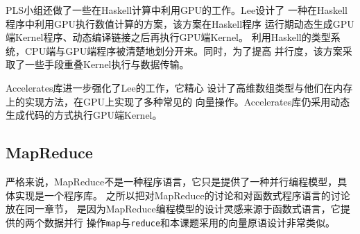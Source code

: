 PLS小组还做了一些在Haskell计算中利用GPU的工作。Lee设计了
一种在Haskell程序中利用GPU执行数值计算的方案，该方案在Haskell程序
运行期动态生成GPU端Kernel程序、动态编译链接之后再执行GPU端Kernel。
利用Haskell的类型系统，CPU端与GPU端程序被清楚地划分开来。同时，为了提高
并行度，该方案采取了一些手段重叠Kernel执行与数据传输。

Accelerates库进一步强化了Lee的工作，它精心
设计了高维数组类型与他们在内存上的实现方法，在GPU上实现了多种常见的
向量操作。Accelerates库仍采用动态生成代码的方式执行GPU端Kernel。


\subsection{MapReduce}
严格来说，MapReduce不是一种程序语言，它只是提供了一种并行编程模型，具体实现是一个程序库。
之所以把对MapReduce的讨论和对函数式程序语言的讨论放在同一章节，
是因为MapReduce编程模型的设计灵感来源于函数式语言，它提供的两个数据并行
操作\texttt{map}与\texttt{reduce}和本课题采用的向量原语设计非常类似。

